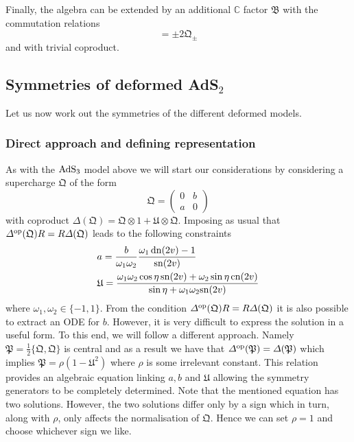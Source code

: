 \documentclass[12pt,a4paper]{article}
\numberwithin{equation}{section}
\newcommand{\kQ}{\mathfrak{Q}}
\newcommand{\kU}{\mathfrak{U}}
\newcommand{\kP}{\mathfrak{P}}
\begin{document}
Finally, the algebra can be extended by an additional $\mathbb{C}$ factor $\mathfrak{B}$ with the commutation relations 
\begin{equation}
[\mathfrak{B},\kQ_\pm]=\pm 2 \kQ_\pm
\end{equation}
and with trivial coproduct. 


\subsection{Symmetries of deformed AdS$_2$}

Let us now work out the symmetries of the different deformed models.

\subsubsection*{Direct approach and defining representation}


As with the ${\rm AdS}_3$ model above we will start our considerations by considering a supercharge $\kQ$ of the form 
\begin{equation}\label{supcharge}
\kQ = \left(
\begin{array}{cc}
0 & b \\
a & 0 
\end{array}
 \right)
\end{equation}
with coproduct $\Delta(\kQ)=\kQ\otimes 1 + \kU \otimes \kQ$. Imposing as usual that $\Delta^{\rm op}(\kQ)R=R \Delta(\kQ)$ leads to the following constraints 
\begin{equation}
\begin{split}
& a = \frac{b}{\omega_1\omega_2}\frac{\omega_1\,{\rm dn}(2v)-1}{{\rm sn}(2v)} \\
& \kU = \frac{\omega_1\omega_2 \cos\eta\, {\rm sn}(2v)+\omega_2 \sin\eta\, {\rm cn}(2v)}{\sin\eta + \omega_1\omega_2 {\rm sn}(2v)}
\end{split}
\end{equation}
where $\omega_1,\omega_2 \in \{-1,1\}$. From the condition $\Delta^{\rm op}(\kQ)R=R \Delta(\kQ)$ it is also possible to extract an ODE for $b$. However, it is very difficult to express the solution in a useful form. To this end, we will follow a different approach. Namely $\kP = \frac{1}{2}\{\kQ,\kQ \}$ is central and as a result we have that $\Delta^{\rm op}(\kP)=\Delta(\kP)$ which implies $\kP = \rho(1-\kU^{2})$ where $\rho$ is some irrelevant constant. This relation provides an algebraic equation linking $a,b$ and $\kU$ allowing the symmetry generators to be completely determined. Note that the mentioned equation has two solutions. However, the two solutions differ only by a sign which in turn, along with $\rho$, only affects the normalisation of $\kQ$. Hence we can set $\rho=1$ and choose whichever sign we like.
\end{document}
